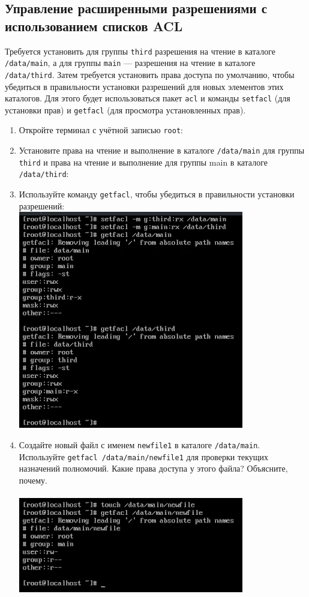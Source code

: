 \documentclass[12pt]{article}
\begin{document}
\subsection{Управление расширенными разрешениями с использованием списков ACL}
Требуется установить для группы \texttt{third} разрешения на чтение в каталоге \texttt{/data/main}, а для группы \texttt{main} — разрешения на чтение в каталоге \texttt{/data/third}. Затем требуется установить права доступа по умолчанию, чтобы убедиться в правильности установки разрешений для новых элементов этих каталогов. Для этого будет использоваться пакет \texttt{acl} и команды \texttt{setfacl} (для установки прав) и \texttt{getfacl} (для просмотра установленных прав).
\begin{enumerate}
	\item Откройте терминал с учётной записью \texttt{root}:
	\item Установите права на чтение и выполнение в каталоге \texttt{/data/main} для группы \texttt{third} и права на чтение и выполнение для группы main в каталоге \texttt{/data/third}:
	\item Используйте команду \texttt{getfacl}, чтобы убедиться в правильности установки разрешений:
	      \\\includegraphics{9.png}
	\item Создайте новый файл с именем \texttt{newfile1} в каталоге \texttt{/data/main}. Используйте \texttt{getfacl /data/main/newfile1} для проверки текущих назначений полномочий. Какие права доступа у этого файла? Объясните, почему.\\
	      \\\includegraphics{10.png}

\end{enumerate}
\end{document}
